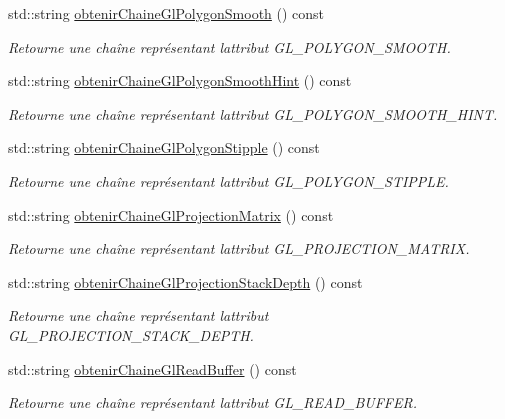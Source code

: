 \begin{DoxyCompactItemize}
std\+::string \hyperlink{group__utilitaire_gac4627c5f84f92d1e259d756aba7d6068}{obtenir\+Chaine\+Gl\+Polygon\+Smooth} () const 
\begin{DoxyCompactList}\small\item\em Retourne une chaîne représentant l\textquotesingle{}attribut G\+L\+\_\+\+P\+O\+L\+Y\+G\+O\+N\+\_\+\+S\+M\+O\+O\+T\+H. \end{DoxyCompactList}\item 
std\+::string \hyperlink{group__utilitaire_ga45100a9646aab1c37b538298c55cb0ca}{obtenir\+Chaine\+Gl\+Polygon\+Smooth\+Hint} () const 
\begin{DoxyCompactList}\small\item\em Retourne une chaîne représentant l\textquotesingle{}attribut G\+L\+\_\+\+P\+O\+L\+Y\+G\+O\+N\+\_\+\+S\+M\+O\+O\+T\+H\+\_\+\+H\+I\+N\+T. \end{DoxyCompactList}\item 
std\+::string \hyperlink{group__utilitaire_ga53fd366a5e9d6eef773c883b1d2914d5}{obtenir\+Chaine\+Gl\+Polygon\+Stipple} () const 
\begin{DoxyCompactList}\small\item\em Retourne une chaîne représentant l\textquotesingle{}attribut G\+L\+\_\+\+P\+O\+L\+Y\+G\+O\+N\+\_\+\+S\+T\+I\+P\+P\+L\+E. \end{DoxyCompactList}\item 
std\+::string \hyperlink{group__utilitaire_ga4e56c1c62378ae9385db874bf2b6a030}{obtenir\+Chaine\+Gl\+Projection\+Matrix} () const 
\begin{DoxyCompactList}\small\item\em Retourne une chaîne représentant l\textquotesingle{}attribut G\+L\+\_\+\+P\+R\+O\+J\+E\+C\+T\+I\+O\+N\+\_\+\+M\+A\+T\+R\+I\+X. \end{DoxyCompactList}\item 
std\+::string \hyperlink{group__utilitaire_gad2d5e19c001663ff2943c43cc9b0c0ea}{obtenir\+Chaine\+Gl\+Projection\+Stack\+Depth} () const 
\begin{DoxyCompactList}\small\item\em Retourne une chaîne représentant l\textquotesingle{}attribut G\+L\+\_\+\+P\+R\+O\+J\+E\+C\+T\+I\+O\+N\+\_\+\+S\+T\+A\+C\+K\+\_\+\+D\+E\+P\+T\+H. \end{DoxyCompactList}\item 
std\+::string \hyperlink{group__utilitaire_ga5d3a759c6f7b623d7598708ca4810b00}{obtenir\+Chaine\+Gl\+Read\+Buffer} () const 
\begin{DoxyCompactList}\small\item\em Retourne une chaîne représentant l\textquotesingle{}attribut G\+L\+\_\+\+R\+E\+A\+D\+\_\+\+B\+U\+F\+F\+E\+R. \end{DoxyCompactList}\item 

\end{DoxyCompactItemize}
